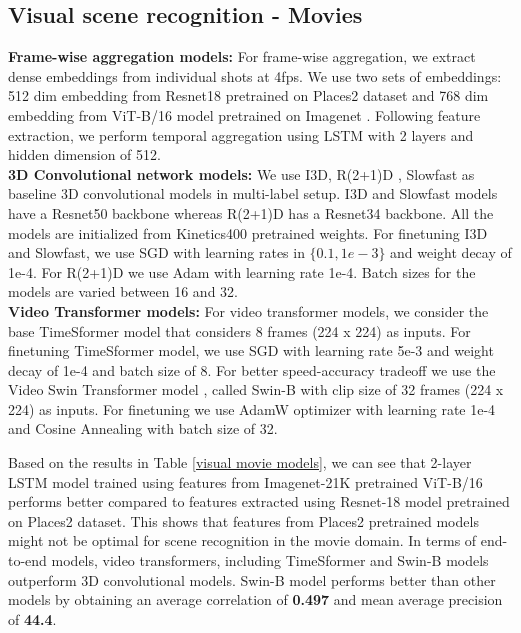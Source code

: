 \subsection{Visual scene recognition - Movies}
\textbf{Frame-wise aggregation models:} For frame-wise aggregation, we extract dense embeddings from individual shots at 4fps. We use two sets of embeddings: 512 dim embedding from Resnet18 \cite{He2015} pretrained on Places2 dataset and 768 dim embedding from ViT-B/16 \cite{dosovitskiy2020vit} model pretrained on Imagenet \cite{Deng2009ImageNetAL}.
Following feature extraction, we perform temporal aggregation using LSTM \cite{lstm} with 2 layers and hidden dimension of 512.
\\
\textbf{3D Convolutional network models:} 
We use I3D\cite{i3d}, R(2+1)D \cite{r2plus1d}, Slowfast \cite{feichtenhofer2019slowfast} as baseline 3D convolutional models in multi-label setup. I3D\cite{i3d} and Slowfast\cite{feichtenhofer2019slowfast} models have a Resnet50\cite{He2015} backbone whereas R(2+1)D \cite{r2plus1d} has a Resnet34\cite{He2015} backbone. All the models are initialized from Kinetics400 \cite{kinetics400} pretrained weights. For finetuning I3D\cite{i3d} and Slowfast\cite{feichtenhofer2019slowfast}, we use SGD with learning rates in $\{0.1,1e-3\}$ and weight decay of 1e-4. For R(2+1)D \cite{r2plus1d} we use Adam \cite{Kingma2015AdamAM} with learning rate 1e-4. Batch sizes for the models are varied between 16 and 32. \\
\textbf{Video Transformer models:}
For video transformer models, we consider the base TimeSformer model \cite{Bertasius2021IsSA} that considers 8 frames (224 x 224) as inputs. For finetuning TimeSformer \cite{Bertasius2021IsSA} model, we use SGD with learning rate 5e-3 and weight decay of 1e-4 and batch size of 8. For better speed-accuracy tradeoff we use the Video Swin Transformer model \cite{liu2021video}, \cite{liu2021Swin} called Swin-B with clip size of 32 frames (224 x 224) as inputs. For finetuning we use AdamW \cite{AdamW} optimizer with learning rate 1e-4 and Cosine Annealing with batch size of 32. 
\par 
Based on the results in Table \ref{visual movie models}, we can see that 2-layer LSTM model trained using features from Imagenet-21K pretrained ViT-B/16 performs better compared to features extracted using Resnet-18 model pretrained on Places2 dataset. This shows that features from Places2 pretrained models might not be optimal for scene recognition in the movie domain.
In terms of end-to-end models, video transformers, including TimeSformer and Swin-B models outperform 3D convolutional models. Swin-B model performs better than other models by obtaining an average correlation of \textbf{0.497} and mean average precision of \textbf{44.4}.
